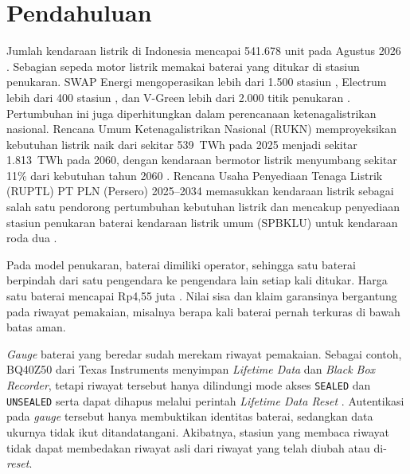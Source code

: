 \documentclass[11pt,a4paper]{article}
\begin{document}
\clearpage

\tableofcontents
\clearpage
{}
\pagestyle{isi}

\section{Pendahuluan}
\label{sec:pendahuluan}

Jumlah kendaraan listrik di Indonesia mencapai 541.678 unit pada Agustus 2026
\cite{okezone}. Sebagian sepeda motor listrik memakai baterai yang ditukar di stasiun penukaran.
SWAP Energi mengoperasikan lebih dari 1.500 stasiun \cite{swapid}, Electrum lebih dari 400
stasiun \cite{electrum}, dan V-Green lebih dari 2.000 titik penukaran \cite{detikvgreen}.
Pertumbuhan ini juga diperhitungkan dalam perencanaan ketenagalistrikan nasional. Rencana Umum
Ketenagalistrikan Nasional (RUKN) memproyeksikan kebutuhan listrik naik dari sekitar 539~TWh
pada 2025 menjadi sekitar 1.813~TWh pada 2060, dengan kendaraan bermotor listrik menyumbang
sekitar 11\% dari kebutuhan tahun 2060 \cite{rukn}. Rencana Usaha Penyediaan Tenaga Listrik
(RUPTL) PT PLN (Persero) 2025--2034 memasukkan kendaraan listrik sebagai salah satu pendorong
pertumbuhan kebutuhan listrik \cite{paparanruptl} dan mencakup penyediaan stasiun penukaran
baterai kendaraan listrik umum (SPBKLU) untuk kendaraan roda dua \cite{databoksruptl}.

Pada model penukaran, baterai dimiliki operator, sehingga satu baterai berpindah dari satu pengendara ke
pengendara lain setiap kali ditukar. Harga satu baterai mencapai Rp4,55 juta \cite{detikvgreen}.
Nilai sisa dan klaim garansinya bergantung pada riwayat pemakaian, misalnya berapa kali baterai
pernah terkuras di bawah batas aman.

\textit{Gauge} baterai yang beredar sudah merekam riwayat pemakaian. Sebagai contoh, BQ40Z50 dari
Texas Instruments menyimpan \textit{Lifetime Data} dan \textit{Black Box Recorder}, tetapi riwayat
tersebut hanya dilindungi mode akses \texttt{SEALED} dan \texttt{UNSEALED} serta dapat dihapus
melalui perintah \textit{Lifetime Data Reset} \cite{bq40z50}. Autentikasi pada \textit{gauge}
tersebut hanya membuktikan identitas baterai, sedangkan data ukurnya tidak ikut ditandatangani.
Akibatnya, stasiun yang membaca riwayat tidak dapat membedakan riwayat asli dari riwayat yang
telah diubah atau di-\textit{reset}.
\end{document}
